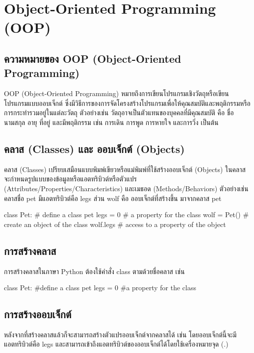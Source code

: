 \chapter{Object-Oriented Programming (OOP)}
\section{ความหมายของ OOP (Object-Oriented Programming)}

OOP (Object-Oriented Programming) หมายถึงการเขียนโปรแกรมเชิงวัตถุหรือเขียนโปรแกรมแบบออบเจ็กต์ ซึ่งมีวิธีการของการจัดโครงสร้างโปรแกรมเพื่อให้คุณสมบัติและพฤติกรรมหรือการกระทำรวมอยู่ในแต่ละวัตถุ \cite{Mar11} ตัวอย่างเช่น วัตถุอาจเป็นตัวแทนของบุคคลที่มีคุณสมบัติ คือ ชื่อ นามสกุล อายุ ที่อยู่ และมีพฤติกรรม เช่น การเดิน การพูด การหายใจ และการวิ่ง เป็นต้น

\section{คลาส (Classes) และ ออบเจ็กต์ (Objects)}

คลาส (Classes) เปรียบเสมือนแบบพิมพ์เขียวหรือแม่พิมพ์ที่ใช้สร้างออบเจ็กต์ (Objects) ในคลาสจะกำหนดรูปแบบของข้อมูลหรือแอตทริบิวต์หรือตัวแปร (Attributes/Properties/Characteristics) และเมธอด (Methods/Behaviors) ตัวอย่างเช่น คลาสชื่อ pet มีแอตทริบิวต์คือ legs ส่วน wolf คือ ออบเจ็กต์ที่สร้างขึ้น มาจากคลาส pet 

\begin{codelist}{}{}
class Pet: # define a class pet
    legs = 0  # a property for the class
    wolf = Pet() # create an object of the class 
    wolf.legs # access to a property of the object
\end{codelist}

\section{การสร้างคลาส}

การสร้างคลาสในภาษา Python ต้องใช้คำสั่ง class ตามด้วยชื่อคลาส เช่น

\begin{codelist}{}{}
class Pet: #define a class pet
    legs = 0 #a property for the class
\end{codelist}


\section{การสร้างออบเจ็กต์}

หลังจากที่สร้างคลาสแล้วก็จะสามารถสร้างตัวแปรออบเจ็กต์จากคลาสได้ เช่น  โดยออบเจ็กต์นี้จะมีแอตทริบิวต์คือ legs และสามารถเข้าถึงแอตทริบิวต์ของออบเจ็กต์ได้โดยใช้เครื่องหมายจุด (.) 

